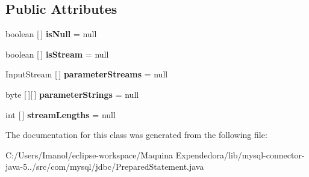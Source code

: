 \subsection*{Public Attributes}
\begin{DoxyCompactItemize}
\item 
\mbox{\label{classcom_1_1mysql_1_1jdbc_1_1_prepared_statement_1_1_batch_params_a44380acf05be7031b1775e0dfd9dfc81}} 
boolean \mbox{[}$\,$\mbox{]} {\bfseries is\+Null} = null
\item 
\mbox{\label{classcom_1_1mysql_1_1jdbc_1_1_prepared_statement_1_1_batch_params_a5a6f85b0bc891fefb33c13df3259c4e8}} 
boolean \mbox{[}$\,$\mbox{]} {\bfseries is\+Stream} = null
\item 
\mbox{\label{classcom_1_1mysql_1_1jdbc_1_1_prepared_statement_1_1_batch_params_a2e0e4a65b19c26be75600c45b0791d59}} 
Input\+Stream \mbox{[}$\,$\mbox{]} {\bfseries parameter\+Streams} = null
\item 
\mbox{\label{classcom_1_1mysql_1_1jdbc_1_1_prepared_statement_1_1_batch_params_ac0039fe01268acdf8d34c4f43a687c5d}} 
byte \mbox{[}$\,$\mbox{]}\mbox{[}$\,$\mbox{]} {\bfseries parameter\+Strings} = null
\item 
\mbox{\label{classcom_1_1mysql_1_1jdbc_1_1_prepared_statement_1_1_batch_params_a18d6913b07dec54cad7a7e56523e7132}} 
int \mbox{[}$\,$\mbox{]} {\bfseries stream\+Lengths} = null
\end{DoxyCompactItemize}


The documentation for this class was generated from the following file\+:\begin{DoxyCompactItemize}
\item 
C\+:/\+Users/\+Imanol/eclipse-\/workspace/\+Maquina Expendedora/lib/mysql-\/connector-\/java-\/5../src/com/mysql/jdbc/Prepared\+Statement.\+java\end{DoxyCompactItemize}
